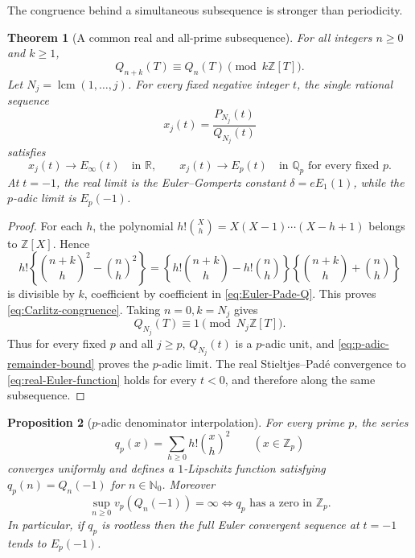 \documentclass[11pt]{article}
\newtheorem{theorem}{Theorem}[section]
\newtheorem{proposition}[theorem]{Proposition}
\theoremstyle{definition}
\theoremstyle{remark}
\newcommand{\Q}{\mathbb Q}
\newcommand{\R}{\mathbb R}
\newcommand{\N}{\mathbb N}
\newcommand{\Z}{\mathbb Z}
\newcommand{\lcm}{\operatorname{lcm}}
\begin{document}
The congruence behind a simultaneous subsequence is stronger than periodicity.

\begin{theorem}[A common real and all-prime subsequence]
\label{thm:common-placewise-subsequence}
For all integers \(n\ge0\) and \(k\ge1\),
\begin{equation}\label{eq:Carlitz-congruence}
 Q_{n+k}(T)\equiv Q_n(T)\pmod{k\Z[T]}.
\end{equation}
Let \(N_j=\lcm(1,\ldots,j)\).  For every fixed negative integer \(t\), the
single rational sequence
\begin{equation}\label{eq:common-rational-sequence}
 x_j(t)=\frac{P_{N_j}(t)}{Q_{N_j}(t)}
\end{equation}
satisfies
\begin{equation}\label{eq:common-placewise-limits}
 \boxed{\displaystyle
 x_j(t)\longrightarrow E_\infty(t)\quad\text{in }\R,
 \qquad
 x_j(t)\longrightarrow E_p(t)\quad\text{in }\Q_p
 \text{ for every fixed }p.}
\end{equation}
At \(t=-1\), the real limit is the Euler--Gompertz constant
\(\delta=eE_1(1)\), while the \(p\)-adic limit is \(E_p(-1)\).
\end{theorem}

\begin{proof}
For each \(h\), the polynomial
\(h!\binom Xh=X(X-1)\cdots(X-h+1)\) belongs to \(\Z[X]\).  Hence
\[
 h!\left\{\binom{n+k}h^2-\binom nh^2\right\}
 =\left\{h!\binom{n+k}h-h!\binom nh\right\}
  \left\{\binom{n+k}h+\binom nh\right\}
\]
is divisible by \(k\), coefficient by coefficient in
\eqref{eq:Euler-Pade-Q}.  This proves \eqref{eq:Carlitz-congruence}.
Taking \(n=0,k=N_j\) gives
\begin{equation}\label{eq:QN-unit-all-p}
 Q_{N_j}(T)\equiv1\pmod{N_j\Z[T]}.
\end{equation}
Thus for every fixed \(p\) and all \(j\ge p\), \(Q_{N_j}(t)\) is a
\(p\)-adic unit, and \eqref{eq:p-adic-remainder-bound} proves the \(p\)-adic
limit.  The real Stieltjes--Pad\'e convergence to
\eqref{eq:real-Euler-function} holds for every \(t<0\), and therefore along
the same subsequence.
\end{proof}

\begin{proposition}[\(p\)-adic denominator interpolation]
\label{prop:p-adic-denominator-interpolation}
For every prime \(p\), the series
\begin{equation}\label{eq:q-p-interpolation}
 q_p(x)=\sum_{h\ge0}h!\binom xh^2\qquad(x\in\Z_p)
\end{equation}
converges uniformly and defines a \(1\)-Lipschitz function satisfying
\(q_p(n)=Q_n(-1)\) for \(n\in\N_0\).  Moreover
\begin{equation}\label{eq:q-p-root-criterion}
 \boxed{\displaystyle
 \sup_{n\ge0}v_p(Q_n(-1))=\infty
 \Longleftrightarrow q_p\text{ has a zero in }\Z_p.}
\end{equation}
In particular, if \(q_p\) is rootless then the full Euler convergent
sequence at \(t=-1\) tends to \(E_p(-1)\).
\end{proposition}
\end{document}
